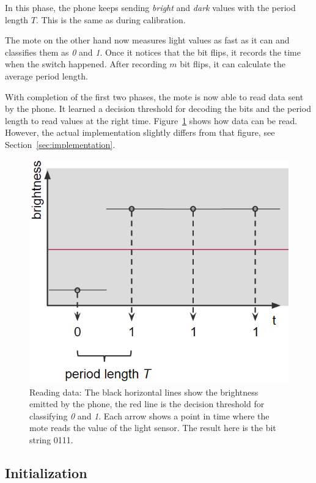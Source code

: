 \documentclass{sig-alternate} %
\begin{document}
In this phase, the phone keeps sending \textit{bright} and \textit{dark} values with the period length $T$.
This is the same as during calibration.

The mote on the other hand now measures light values as fast as it can and classifies them as \textit{0} and \textit{1}.
Once it notices that the bit flips, it records the time when the switch happened.
After recording $m$ bit flips, it can calculate the average period length.

With completion of the first two phases, the mote is now able to read data sent by the phone.
It learned a decision threshold for decoding the bits and the period length to read values at the right time.
Figure~\ref{fig:read_a_bit} shows how data can be read.
However, the actual implementation slightly differs from that figure, see Section~\ref{sec:implementation}.

\begin{figure}
	\centering
	\includegraphics[scale=.5]{images/reading_data.png}
	\caption{Reading data: The black horizontal lines show the brightness emitted by the phone, the red line is the decision threshold for classifying \textit{0} and \textit{1}. Each arrow shows a point in time where the mote reads the value of the light sensor. The result here is the bit string 0111.}
	\label{fig:read_a_bit}
\end{figure}

\subsection{Initialization}
\label{sub:initialization}
\end{document}
